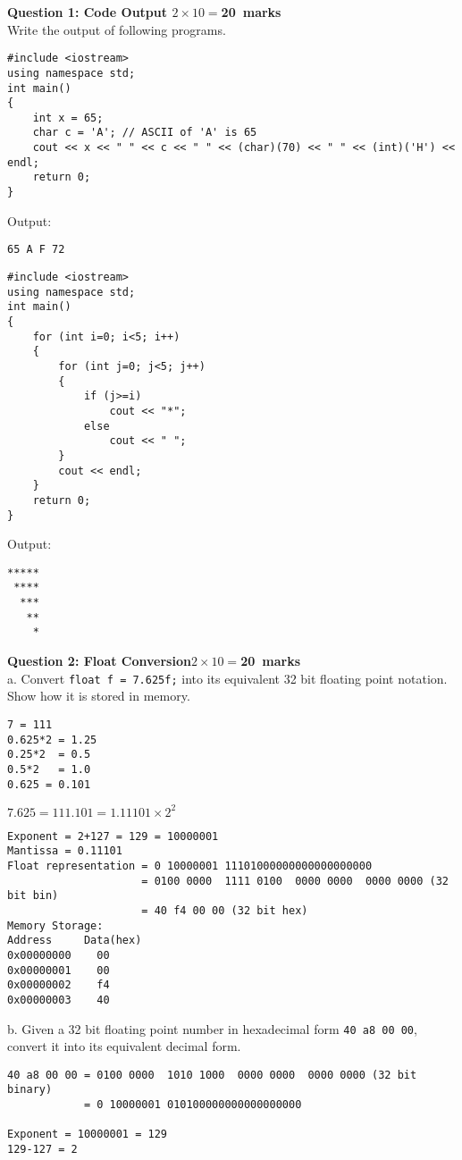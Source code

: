 \documentclass[12pt,a4paper]{article}
\def\Qone{20}
\def\Qtwo{20}
\begin{document}
\newpage
\pagestyle{fancy}
\noindent\textbf{Question 1: Code Output \hfill $2\times10=$\Qone~marks}\\
Write the output of following programs.
\begin{lstlisting}
#include <iostream>
using namespace std;
int main()
{
	int x = 65;
	char c = 'A'; // ASCII of 'A' is 65
	cout << x << " " << c << " " << (char)(70) << " " << (int)('H') << endl;
	return 0;
}
\end{lstlisting}
Output:
\begin{verbatim}
65 A F 72
\end{verbatim}
\begin{lstlisting}
#include <iostream>
using namespace std;
int main()
{
	for (int i=0; i<5; i++)
	{
		for (int j=0; j<5; j++)
		{
			if (j>=i)
				cout << "*";
			else
				cout << " ";
		}
		cout << endl;
	}
	return 0;
}
\end{lstlisting}
Output:
\begin{verbatim}
*****
 ****
  ***
   **
    *
\end{verbatim}
\newpage
\noindent \textbf{Question 2: Float Conversion\hfill $2\times10=$\Qtwo~marks}\\
a. Convert \verb|float f = 7.625f;| into its equivalent 32 bit floating point notation. Show how it is stored in memory.
\begin{verbatim}
7 = 111
0.625*2 = 1.25
0.25*2  = 0.5
0.5*2   = 1.0
0.625 = 0.101
\end{verbatim}
\begin{math}
7.625 = 111.101 = 1.11101\times2^{2}
\end{math}
\begin{verbatim}
Exponent = 2+127 = 129 = 10000001
Mantissa = 0.11101
Float representation = 0 10000001 11101000000000000000000
                     = 0100 0000  1111 0100  0000 0000  0000 0000 (32 bit bin)
                     = 40 f4 00 00 (32 bit hex)
Memory Storage:
Address     Data(hex)
0x00000000    00
0x00000001    00
0x00000002    f4
0x00000003    40
\end{verbatim}
b. Given a 32 bit floating point number in hexadecimal form \verb|40 a8 00 00|, convert it into its equivalent decimal form.
\begin{verbatim}
40 a8 00 00 = 0100 0000  1010 1000  0000 0000  0000 0000 (32 bit binary)
            = 0 10000001 010100000000000000000

Exponent = 10000001 = 129
129-127 = 2
\end{verbatim}
\end{document}

